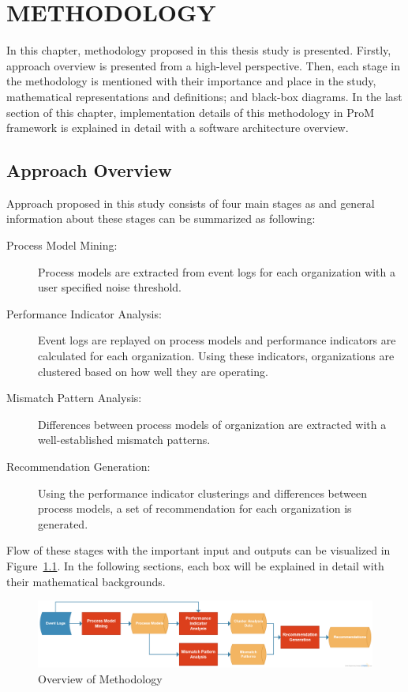 \chapter{METHODOLOGY}
\label{chp:methodology}

In this chapter, methodology proposed in this thesis study is presented. Firstly, approach overview is presented from a high-level perspective. Then, each stage in the methodology is mentioned with their importance and place in the study, mathematical representations and definitions; and black-box diagrams. In the last section of this chapter, implementation details of this methodology in ProM framework is explained in detail with a software architecture overview.

\section{Approach Overview}
\label{sec:approach-overview}
Approach proposed in this study consists of four main stages as and general information about these stages can be summarized as following:
\begin{description}
	\item[Process Model Mining:] Process models are extracted from event logs for each organization with a user specified noise threshold.
	\item[Performance Indicator Analysis:] Event logs are replayed on process models and performance indicators are calculated for each organization. Using these indicators, organizations are clustered based on how well they are operating.
	\item[Mismatch Pattern Analysis:] Differences between process models of organization are extracted with a well-established mismatch patterns.
	\item[Recommendation Generation:] Using the performance indicator clusterings and differences between process models, a set of recommendation for each organization is generated.
\end{description}

Flow of these stages with the important input and outputs can be visualized in Figure~\ref{fig:approach-overview}. In the following sections, each box will be explained in detail with their mathematical backgrounds.
\begin{figure}
  \centering
  \includegraphics[width=\textwidth]{4_methodology/approach-overview}
  \caption{Overview of Methodology}
  \label{fig:approach-overview}
\end{figure}

